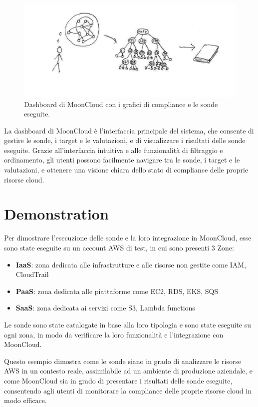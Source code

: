 \begin{center}
\begin{figure}
\centering
\includegraphics[width=\textwidth]{immagini/ideas2text.pdf}
\caption{Dashboard di MoonCloud con i grafici di compliance e le sonde eseguite.}
\label{fig:dashboardmooncloud}
\end{figure}
\end{center}

La dashboard di MoonCloud è l'interfaccia principale del sistema, che consente di gestire le sonde, i target e le valutazioni, e di visualizzare i risultati delle sonde eseguite. Grazie all'interfaccia intuitiva e alle funzionalità di filtraggio e ordinamento, gli utenti possono facilmente navigare tra le sonde, i target e le valutazioni, e ottenere una visione chiara dello stato di compliance delle proprie risorse cloud. 

\section{Demonstration}
\label{sec:demonstration}

Per dimostrare l'esecuzione delle sonde e la loro integrazione in MoonCloud, esse sono state eseguite su un account AWS di test, in cui sono presenti 3 Zone:

\begin{itemize}
    \item \textbf{IaaS}: zona dedicata alle infrastrutture e alle risorse non gestite come IAM, CloudTrail
    \item \textbf{PaaS}: zona dedicata alle piattaforme come EC2, RDS, EKS, SQS
    \item \textbf{SaaS}: zona dedicata ai servizi come S3, Lambda functions
\end{itemize}

Le sonde sono state catalogate in base alla loro tipologia e sono state eseguite su ogni zona, in modo da verificare la loro funzionalità e l'integrazione con MoonCloud.

Questo esempio dimostra come le sonde siano in grado di analizzare le risorse AWS in un contesto reale, assimilabile ad un ambiente di produzione aziendale, e come MoonCloud sia in grado di presentare i risultati delle sonde eseguite, consentendo agli utenti di monitorare la compliance delle proprie risorse cloud in modo efficace.